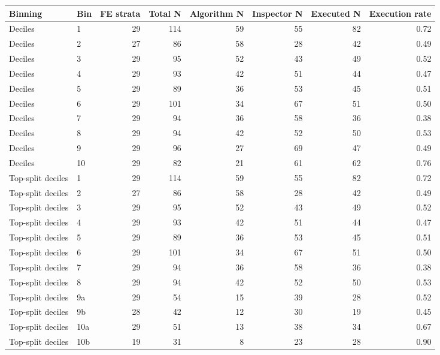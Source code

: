 \begin{tabular}{llrrrrrr}
\toprule
Binning & Bin & FE strata & Total N & Algorithm N & Inspector N & Executed N & Execution rate \\
\midrule
Deciles & 1 & 29 & 114 & 59 & 55 & 82 &  0.72 \\
Deciles & 2 & 27 & 86 & 58 & 28 & 42 &  0.49 \\
Deciles & 3 & 29 & 95 & 52 & 43 & 49 &  0.52 \\
Deciles & 4 & 29 & 93 & 42 & 51 & 44 &  0.47 \\
Deciles & 5 & 29 & 89 & 36 & 53 & 45 &  0.51 \\
Deciles & 6 & 29 & 101 & 34 & 67 & 51 &  0.50 \\
Deciles & 7 & 29 & 94 & 36 & 58 & 36 &  0.38 \\
Deciles & 8 & 29 & 94 & 42 & 52 & 50 &  0.53 \\
Deciles & 9 & 29 & 96 & 27 & 69 & 47 &  0.49 \\
Deciles & 10 & 29 & 82 & 21 & 61 & 62 &  0.76 \\
Top-split deciles & 1 & 29 & 114 & 59 & 55 & 82 &  0.72 \\
Top-split deciles & 2 & 27 & 86 & 58 & 28 & 42 &  0.49 \\
Top-split deciles & 3 & 29 & 95 & 52 & 43 & 49 &  0.52 \\
Top-split deciles & 4 & 29 & 93 & 42 & 51 & 44 &  0.47 \\
Top-split deciles & 5 & 29 & 89 & 36 & 53 & 45 &  0.51 \\
Top-split deciles & 6 & 29 & 101 & 34 & 67 & 51 &  0.50 \\
Top-split deciles & 7 & 29 & 94 & 36 & 58 & 36 &  0.38 \\
Top-split deciles & 8 & 29 & 94 & 42 & 52 & 50 &  0.53 \\
Top-split deciles & 9a & 29 & 54 & 15 & 39 & 28 &  0.52 \\
Top-split deciles & 9b & 28 & 42 & 12 & 30 & 19 &  0.45 \\
Top-split deciles & 10a & 29 & 51 & 13 & 38 & 34 &  0.67 \\
Top-split deciles & 10b & 19 & 31 & 8 & 23 & 28 &  0.90 \\
\bottomrule
\end{tabular}
